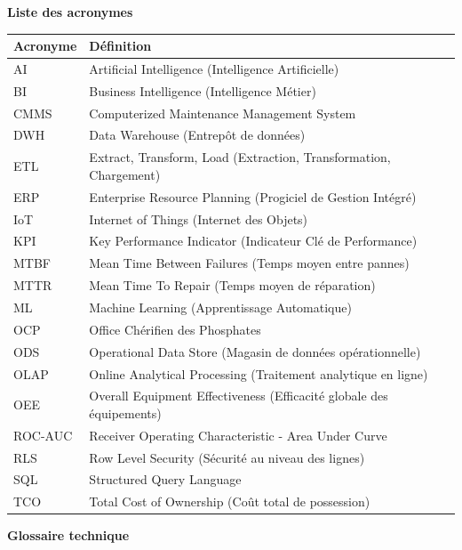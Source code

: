\documentclass[a4paper,12pt]{report}
\begin{document}
\newpage
\thispagestyle{empty}
\begin{center}
\Large\textbf{Liste des acronymes}
\end{center}

\vspace{2cm}

\begin{longtable}{p{3cm}p{11cm}}
\textbf{Acronyme} & \textbf{Définition} \\
\hline
AI & Artificial Intelligence (Intelligence Artificielle) \\
BI & Business Intelligence (Intelligence Métier) \\
CMMS & Computerized Maintenance Management System \\
DWH & Data Warehouse (Entrepôt de données) \\
ETL & Extract, Transform, Load (Extraction, Transformation, Chargement) \\
ERP & Enterprise Resource Planning (Progiciel de Gestion Intégré) \\
IoT & Internet of Things (Internet des Objets) \\
KPI & Key Performance Indicator (Indicateur Clé de Performance) \\
MTBF & Mean Time Between Failures (Temps moyen entre pannes) \\
MTTR & Mean Time To Repair (Temps moyen de réparation) \\
ML & Machine Learning (Apprentissage Automatique) \\
OCP & Office Chérifien des Phosphates \\
ODS & Operational Data Store (Magasin de données opérationnelle) \\
OLAP & Online Analytical Processing (Traitement analytique en ligne) \\
OEE & Overall Equipment Effectiveness (Efficacité globale des équipements) \\
ROC-AUC & Receiver Operating Characteristic - Area Under Curve \\
RLS & Row Level Security (Sécurité au niveau des lignes) \\
SQL & Structured Query Language \\
TCO & Total Cost of Ownership (Coût total de possession) \\
\end{longtable}

\newpage
\thispagestyle{empty}
\begin{center}
\Large\textbf{Glossaire technique}
\end{center}
\end{document}
